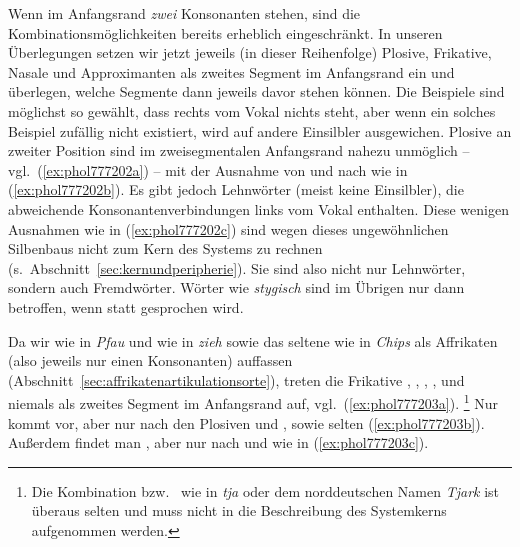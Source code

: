Wenn im Anfangsrand \textit{zwei} Konsonanten stehen, sind die Kombinationsmöglichkeiten bereits erheblich eingeschränkt.
In unseren Überlegungen setzen wir jetzt jeweils (in dieser Reihenfolge) Plosive, Frikative, Nasale und Approximanten als zweites Segment im Anfangsrand ein und überlegen, welche Segmente dann jeweils davor stehen können.
Die Beispiele sind möglichst so gewählt, dass rechts vom Vokal nichts steht, aber wenn ein solches Beispiel zufällig nicht existiert, wird auf andere Einsilbler ausgewichen.
Plosive an zweiter Position sind im zweisegmentalen Anfangsrand nahezu unmöglich -- vgl.\ (\ref{ex:phol777202a}) -- mit der Ausnahme von \textipa{[p]} und \textipa{[t]} nach \textipa{[S]} wie in (\ref{ex:phol777202b}).
Es gibt jedoch Lehnwörter (meist keine Einsilbler), die abweichende Konsonantenverbindungen links vom Vokal enthalten.
Diese wenigen Ausnahmen wie in (\ref{ex:phol777202c}) sind wegen dieses ungewöhnlichen Silbenbaus nicht zum Kern des Systems zu rechnen (s.\ Abschnitt~\ref{sec:kernundperipherie}).
Sie sind also nicht nur Lehnwörter, sondern auch Fremdwörter.
Wörter wie \textit{stygisch} sind im Übrigen nur dann betroffen, wenn \textipa{[st]} statt \textipa{[St]} gesprochen wird.

\begin{exe}
  \ex\label{ex:phol777202}
  \begin{xlist}
  \end{xlist}
\end{exe}

Da wir \textipa{[\t{pf}]} wie in \textit{Pfau} und \textipa{[\t{ts}]} wie in \textit{zieh} sowie das seltene \textipa{[\t{tS}]} wie in \textit{Chips} als Affrikaten (also jeweils nur einen Konsonanten) auffassen (Abschnitt~\ref{sec:affrikatenartikulationsorte}), treten die Frikative \textipa{[f]}, \textipa{[s]}, \textipa{[S]}, \textipa{[h]}, \textipa{[z]} und \textipa{[J]} niemals als zweites Segment im Anfangsrand auf, vgl.\ (\ref{ex:phol777203a}).%
\footnote{Die Kombination \textipa{[tJ]} bzw.\ \textipa{[t\c{c}]} wie in \textit{tja} oder dem norddeutschen Namen \textit{Tjark} ist überaus selten und muss nicht in die Beschreibung des Systemkerns aufgenommen werden.}
Nur \textipa{[K]} kommt vor, aber nur nach den Plosiven und \textipa{[f]}, \textipa{[S]} sowie selten \textipa{[v]} (\ref{ex:phol777203b}).
Außerdem findet man \textipa{[v]}, aber nur nach \textipa{[k]} und \textipa{[S]} wie in (\ref{ex:phol777203c}).

